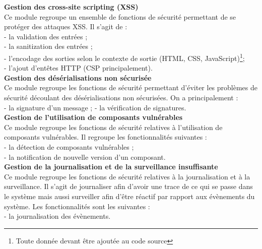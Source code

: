 \textbf{\RIGHTarrow Gestion des cross-site scripting (XSS)}\\
Ce module regroupe un ensemble de fonctions de sécurité permettant de se protéger des attaques XSS. Il s'agit de : \\
- la validation des entrées ;\\
- la sanitization des entrées ;\\
- l'encodage des sorties selon le contexte de sortie (HTML, CSS, JavaScript)\footnote{Toute donnée devant être ajoutée au code source}; \\
- l'ajout d'entêtes HTTP (CSP principalement).\\

\textbf{\RIGHTarrow Gestion des désérialisations non sécurisée}\\
Ce module regroupe les fonctions de sécurité permettant d'éviter les problèmes de sécurité découlant des désérialisations non sécurisées. On a principalement : \\
- la signature d'un message ;
- la vérification de signatures.\\


\textbf{\RIGHTarrow Gestion de l'utilisation de composants vulnérables}\\
Ce module regroupe les fonctions de sécurité relatives à l'utilisation de composants vulnérables. Il regroupe les fonctionnalités suivantes : \\
- la détection de composants vulnérables ; \\
- la notification de nouvelle version d'un composant.\\

\textbf{\RIGHTarrow Gestion de la journalisation et de la surveillance insuffisante}\\
Ce module regroupe les fonctions de sécurité relatives à la journalisation et à la surveillance. Il s'agit de journaliser afin d'avoir une trace de ce qui se passe dans le système mais aussi surveiller afin d'être réactif par rapport aux évènements du système. Les fonctionnalités sont les suivantes :\\
- la journalisation des évènements. \\


